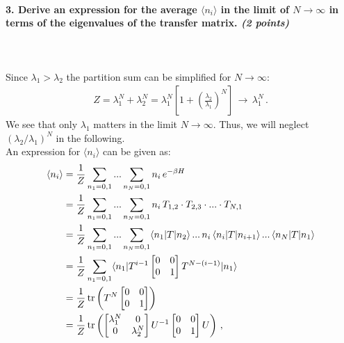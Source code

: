 \paragraph{3. Derive an expression for the 
    average $\langle n_i\rangle$ in the limit 
    of $N\to\infty$ in terms of the 
    eigenvalues of the transfer matrix.
    \textit{(2 points)}
} \ \\
\\
Since $\lambda_1>\lambda_2$ the partition sum can be simplified for $N\to\infty$:
\begin{align}
	Z = \lambda_1^N + \lambda_2^N
	= \lambda_1^N \left[1+\left(\frac{\lambda_2}{\lambda_1}\right)^N\right] \,
	\longrightarrow \, \lambda_1^N \,.
\end{align}
We see that only $\lambda_1$ matters in the limit $N\to\infty$. Thus, we will 
neglect $(\lambda_2/\lambda_1)^N$ in the following. \\
An expression for $\langle n_i\rangle$ can be given as:
\begin{align}
	\langle n_i\rangle &= \frac{1}{Z} \sum_{n_1=0,1}...\sum_{n_N=0,1}
	n_i \, e^{-\beta H} \notag \\
	&= \frac{1}{Z} \sum_{n_1=0,1} ... \sum_{n_N=0,1} n_i \,
	T_{1,2} \cdot T_{2,3} \cdot ... \cdot T_{N,1} \notag \\
	&= \frac{1}{Z} \sum_{n_1=0,1} ... \sum_{n_N=0,1}
	\langle n_1 \vert T \vert n_2 \rangle \,
	... \, n_i \, \langle n_i \vert T \vert n_{i+1} \rangle \, ... \,
	\langle n_N \vert T \vert n_1 \rangle \notag \\
	&= \frac{1}{Z} \sum_{n_1=0,1}
	\langle n_1 \vert T^{i-1} 
	\begin{bmatrix}
    0 & 0 \\
    0 & 1
    \end{bmatrix}
	T^{N-(i-1)} \vert n_1 \rangle \notag \\
	&= \frac{1}{Z} \, \text{tr}\left( T^N
	\begin{bmatrix}
    0 & 0 \\
    0 & 1
    \end{bmatrix}
	\right) \notag \\
	&= \frac{1}{Z} \, \text{tr}\left(
	\begin{bmatrix}
    \lambda_1^N & 0 \\
    0 & \lambda_2^N
    \end{bmatrix} U^{-1}
	\begin{bmatrix}
    0 & 0 \\
    0 & 1
    \end{bmatrix} U
	\right) \,,
\end{align}
